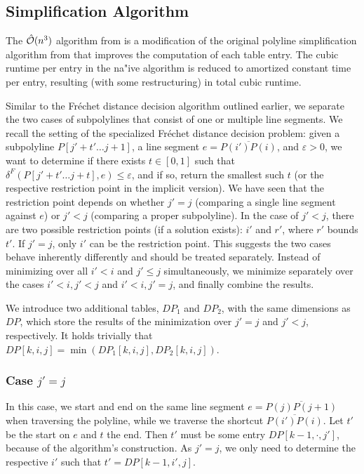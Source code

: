 \subsection{Simplification Algorithm}
\label{ssec:simplification_algo_cubic}

The \(\hat{\mathcal{O}}(n^3)\) algorithm from \citeauthor{polyline_simplification_has_cubic_complexity_bringmannetal} is a modification of the original polyline simplification algorithm from \citeauthor{on_optimal_polyline_simplification_using_the_hausdorff_and_frechet_distance} that improves the computation of each table entry. The cubic runtime per entry in the na"ive algorithm is reduced to amortized constant time per entry, resulting (with some restructuring) in total cubic runtime.

Similar to the Fréchet distance decision algorithm outlined earlier, we separate the two cases of subpolylines that consist of one or multiple line segments. We recall the setting of the specialized Fréchet distance decision problem: given a subpolyline \(P[j' + t' \dots j + 1]\), a line segment \(e = \overline{P(i')P(i)}\), and \(\varepsilon > 0\), we want to determine if there exists \(t \in [0, 1]\) such that \(\delta^F(P[j' + t' \dots j + t], e) \leq \varepsilon\), and if so, return the smallest such \(t\) (or the respective restriction point in the implicit version). We have seen that the restriction point depends on whether \(j' = j\) (comparing a single line segment against \(e\)) or \(j' < j\) (comparing a proper subpolyline).
In the case of \(j' < j\), there are two possible restriction points (if a solution exists): \(i'\) and \(r'\), where \(r'\) bounds \(t'\). If \(j' = j\), only \(i'\) can be the restriction point. This suggests the two cases behave inherently differently and should be treated separately. Instead of minimizing over all \(i' < i\) and \(j' \leq j\) simultaneously, we minimize separately over the cases \(i' < i, j' < j\) and \(i' < i, j' = j\), and finally combine the results.

We introduce two additional tables, \(DP_1\) and \(DP_2\), with the same dimensions as \(DP\), which store the results of the minimization over \(j'=j\) and \(j' < j\), respectively. It holds trivially that \(DP[k, i, j] = \min(DP_1[k,i,j], DP_2[k,i,j])\).

\subsubsection{Case \(j' = j\)}

In this case, we start and end on the same line segment \(e = \overline{P(j)P(j+1)}\) when traversing the polyline, while we traverse the shortcut \(\overline{P(i')P(i)}\). Let \(t'\) be the start on \(e\) and \(t\) the end. Then \(t'\) must be some entry \(DP[k-1, \cdot, j']\), because of the algorithm's construction. As \(j' = j\), we only need to determine the respective \(i'\) such that \(t' = DP[k-1, i', j]\).

